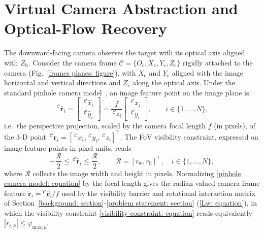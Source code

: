 \documentclass{IEEEtaes}
\theoremstyle{definition}
\theoremstyle{remark}
\begin{document}
\section{Virtual Camera Abstraction and Optical-Flow Recovery} \label{virtual camera: section}
The downward-facing camera observes the target with its optical axis aligned with $Z_\text{b}$. Consider the camera frame $\mathcal{C}=\{O_{\text{c}},X_{\text{c}},Y_{\text{c}},Z_{\text{c}}\}$ rigidly attached to the camera (Fig.~\ref{frames planes: figure}), with $X_{\text{c}}$ and $Y_{\text{c}}$ aligned with the image horizontal and vertical directions and $Z_{\text{c}}$ along the optical axis. Under the standard pinhole camera model~\cite{chaumette2006}, an image feature point on the image plane is
\begin{equation}
\label{pinhole camera model: equation}
    \,^\mathcal{C}\hat{\boldsymbol{r}}_i = \begin{bmatrix} \,^\mathcal{C}\hat{x}_i \\ \,^\mathcal{C}\hat{y}_i \end{bmatrix}
    = \frac{f}{\,^\mathcal{C}z_i}\begin{bmatrix} \,^\mathcal{C}x_i \\ \,^\mathcal{C}y_i \end{bmatrix},\qquad i\in\{1,\ldots,N\},
\end{equation}
i.e.\ the perspective projection, scaled by the camera focal length $f$ (in pixels), of the 3-D point $\,^\mathcal{C}\boldsymbol{r}_i=[\,^\mathcal{C}x_i,\,^\mathcal{C}y_i,\,^\mathcal{C}z_i]^{\top}$. The FoV visibility constraint, expressed on image feature points in pixel units, reads
\begin{equation} \label{visibility constraint: equation}
    -\frac{\mathcal{R}}{2} \le \,^\mathcal{C}\hat{\boldsymbol{r}}_i \le \frac{\mathcal{R}}{2},\qquad \mathcal{R}=[r_\text{w},r_\text{h}]^\top,\quad i\in\{1,\ldots,N\},
\end{equation}
where $\mathcal{R}$ collects the image width and height in pixels. Normalizing \eqref{pinhole camera model: equation} by the focal length gives the radian-valued camera-frame feature $\tilde{\boldsymbol{r}}_i={}^\mathcal{C}\hat{\boldsymbol{r}}_i/f$ used by the visibility barrier and rotational interaction matrix of Section~\ref{background: section}-\ref{problem statement: section} (\eqref{Lw: equation}), in which the visibility constraint \eqref{visibility constraint: equation} reads equivalently $|\tilde{r}_{i,k}|\le\varphi_{\text{max},k}$.
\end{document}
